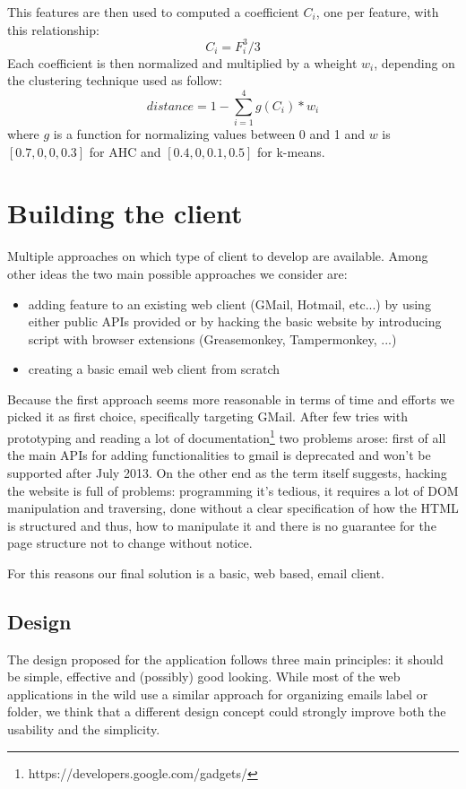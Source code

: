 \documentclass[a4paper,12pt]{report}
\begin{document}
This features are then used to computed a coefficient $C_{i}$, one per feature, with this relationship:
\[C_{i} = F_{i}^3 / 3 \]
Each coefficient is then normalized and multiplied by a wheight $w_{i}$, depending on the clustering technique used as follow:
\[distance = 1 - \sum_{i=1}^{4} g(C_i)*w_i \]
where $g$ is a function for normalizing values between 0 and 1 and $w$ is $[0.7, 0, 0, 0.3]$ for AHC and $[0.4, 0, 0.1, 0.5]$ for k-means.
\chapter{Building the client}
Multiple approaches on which type of client to develop are available. Among other ideas the two main possible approaches we consider are:
\begin{itemize}
\item adding feature to an existing web client (GMail, Hotmail, etc...) by using either public APIs provided or by hacking the basic website by introducing script with browser extensions (Greasemonkey, Tampermonkey, ...)
\item creating a basic email web client from scratch
\end{itemize}

Because the first approach seems more reasonable in terms of time and efforts we picked it as first choice, specifically targeting GMail. After few tries with prototyping and reading a lot of documentation\footnote{https://developers.google.com/gadgets/} two problems arose: first of all the main APIs for adding functionalities to gmail is deprecated and won't be supported after July 2013. On the other end as the term itself suggests, hacking the website is full of problems: programming it's tedious, it requires a lot of DOM manipulation and traversing, done without a clear specification of how the HTML is structured and thus, how to manipulate it and there is no guarantee for the page structure not to change without notice.

For this reasons our final solution is a basic, web based, email client.
\section{Design}

The design proposed for the application follows three main principles: it should be simple, effective and (possibly) good looking.
While most of the web applications in the wild use a similar approach for organizing emails label or folder, we think that a different design concept could strongly improve both the usability and the simplicity.
\end{document}
